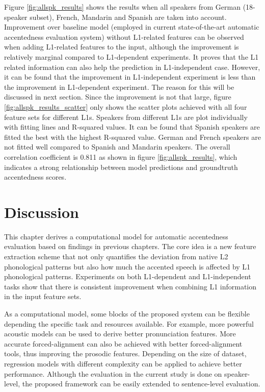 Figure \ref{fig:allspk_results} shows the results when all speakers from German (18-speaker subset), French, Mandarin and Spanish are taken into account. Improvement over baseline model (employed in current state-of-the-art automatic accentedness evaluation system) without L1-related features can be observed when adding L1-related features to the input, although the improvement is relatively marginal compared to L1-dependent experiments. It proves that the L1 related information can also help the prediction in L1-independent case. However, it can be found that the improvement in L1-independent experiment is less than the improvement in L1-dependent experiment. The reason for this will be discussed in next section. Since the improvement is not that large, figure \ref{fig:allspk_results_scatter} only shows the scatter plots achieved with all four feature sets for different L1s. Speakers from different L1s are plot individually with fitting lines and R-squared values. It can be found that Spanish speakers are fitted the best with the highest R-squared value. German and French speakers are not fitted well compared to Spanish and Mandarin speakers. The overall correlation coefficient is 0.811 as shown in figure \ref{fig:allspk_results}, which indicates a strong relationship between model predictions and groundtruth accentedness scores.

\section{Discussion}

This chapter derives a computational model for automatic accentedness evaluation based on findings in previous chapters. The core idea is a new feature extraction scheme that not only quantifies the deviation from native L2 phonological patterns but also how much the accented speech is affected by L1 phonological patterns. Experiments on both L1-dependent and L1-independent tasks show that there is consistent improvement when combining L1 information in the input feature sets.

As a computational model, some blocks of the proposed system can be flexible depending the specific task and resources available. For example, more powerful acoustic models can be used to derive better pronunciation features. More accurate forced-alignment can also be achieved with better forced-alignment tools, thus improving the prosodic features. Depending on the size of dataset, regression models with different complexity can be applied to achieve better performance. Although the evaluation in the current study is done on speaker-level, the proposed framework can be easily extended to sentence-level evaluation.

